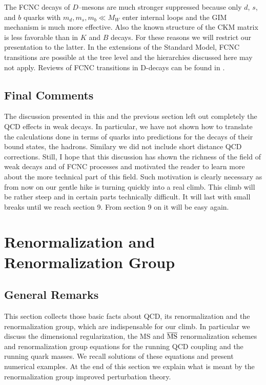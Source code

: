 \documentclass[12pt,rotate]{article}
\begin{document}
\begin{itemize}
The FCNC decays of $D$--mesons are much stronger suppressed because only
$d$, $s$, and $b$ quarks with $m_d,m_s,m_b\ll M_W$ enter internal loops
and the GIM mechanism is much more effective. Also the known structure
of the CKM matrix is less favorable than in $K$ and $B$ decays. For these
reasons we will restrict our presentation to the latter.
In the extensions of the Standard Model, FCNC transitions are possible
at the tree level and the hierarchies discussed here may not apply.
Reviews of FCNC transitions in D-decays can be found in \cite{DDD}.
\subsection{Final Comments}
The discussion presented in this and the previous section left out completely 
the QCD effects in weak decays.
In particular, we have not shown how
to translate the calculations done in terms of quarks into predictions
for the decays of their bound states, the hadrons. Similary
we did not include short distance QCD corrections. 
Still, I hope that this discussion has shown the richness of the field
of weak decays and of FCNC processes and motivated the reader to
learn more about the more technical part of this field. Such
motivation is clearly necessary as from now on our gentle hike
is turning quickly into a real climb. This climb will be rather
steep and in certain parts technically difficult. It will last
with small breaks until we reach section 9. From section 9 on it will
be easy again. 
\section{Renormalization and Renormalization Group}
\setcounter{equation}{0}
\subsection{General Remarks}
This section collects  those basic facts about QCD, its renormalization
and the renormalization group,
which are indispensable for our climb. In particular we discuss
the dimensional regularization, the MS and ${\rm\overline{MS}}$
renormalization schemes and renormalization group equations
for the running QCD coupling and the running quark masses.
We recall solutions of these equations and present numerical
examples. At the end of this section we explain what is meant
by the renormalization group improved perturbation theory.

\end{itemize}
\end{document}
